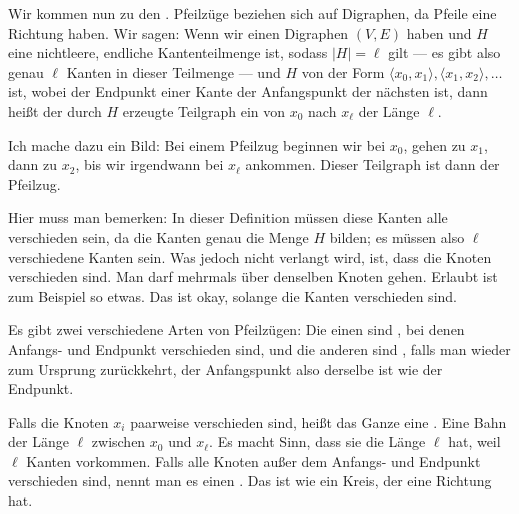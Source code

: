 \begin{spoken-clean}[01:01:14 - 01:07:24]
Wir kommen nun zu den . Pfeilzüge beziehen sich auf Digraphen, da Pfeile eine Richtung haben. Wir sagen: Wenn wir einen Digraphen $(V, E)$ haben und $H$ eine nichtleere, endliche Kantenteilmenge ist, sodass $|H| = \ell$ gilt --- es gibt also genau $\ell$ Kanten in dieser Teilmenge --- und $H$ von der Form $\langle x_0, x_1 \rangle, \langle x_1, x_2 \rangle, \dots$ ist, wobei der Endpunkt einer Kante der Anfangspunkt der nächsten ist, dann heißt der durch $H$ erzeugte Teilgraph ein  von $x_0$ nach $x_\ell$ der Länge $\ell$.

Ich mache dazu ein Bild: Bei einem Pfeilzug beginnen wir bei $x_0$, gehen zu $x_1$, dann zu $x_2$, bis wir irgendwann bei $x_\ell$ ankommen. Dieser Teilgraph ist dann der Pfeilzug.

Hier muss man bemerken: In dieser Definition müssen diese Kanten alle verschieden sein, da die Kanten genau die Menge $H$ bilden; es müssen also $\ell$ verschiedene Kanten sein. Was jedoch nicht verlangt wird, ist, dass die Knoten verschieden sind. Man darf mehrmals über denselben Knoten gehen. Erlaubt ist zum Beispiel so etwas. Das ist okay, solange die Kanten verschieden sind.

Es gibt zwei verschiedene Arten von Pfeilzügen: Die einen sind , bei denen Anfangs- und Endpunkt verschieden sind, und die anderen sind , falls man wieder zum Ursprung zurückkehrt, der Anfangspunkt also derselbe ist wie der Endpunkt.

Falls die Knoten $x_i$ paarweise verschieden sind, heißt das Ganze eine . Eine Bahn der Länge $\ell$ zwischen $x_0$ und $x_\ell$. Es macht Sinn, dass sie die Länge $\ell$ hat, weil $\ell$ Kanten vorkommen. Falls alle Knoten außer dem Anfangs- und Endpunkt verschieden sind, nennt man es einen . Das ist wie ein Kreis, der eine Richtung hat.
\end{spoken-clean}

